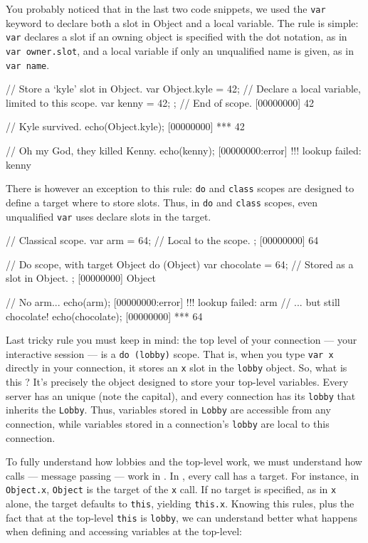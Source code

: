 You probably noticed that in the last two code snippets, we used the
\lstinline|var| keyword to declare both a slot in Object and a local
variable. The rule is simple: \lstinline|var| declares a slot if an
owning object is specified with the dot notation, as in %
\lstinline|var owner.slot|, and a local variable if only an
unqualified name is given, as in \lstinline|var name|.

\begin{urbiscript}
{
  // Store a `kyle' slot in Object.
  var Object.kyle = 42;
  // Declare a local variable, limited to this scope.
  var kenny = 42;
}; // End of scope.
[00000000] 42

// Kyle survived.
echo(Object.kyle);
[00000000] *** 42

// Oh my God, they killed Kenny.
echo(kenny);
[00000000:error] !!! lookup failed: kenny
\end{urbiscript}

There is however an exception to this rule: \lstinline|do| and
\lstinline|class| scopes are designed to define a target where to
store slots. Thus, in \lstinline|do| and \lstinline|class| scopes,
even unqualified \lstinline|var| uses declare slots in the target.

\begin{urbiscript}
// Classical scope.
{
  var arm = 64; // Local to the scope.
};
[00000000] 64

// Do scope, with target Object
do (Object)
{
  var chocolate = 64; // Stored as a slot in Object.
};
[00000000] Object

// No arm...
echo(arm);
[00000000:error] !!! lookup failed: arm
// ... but still chocolate!
echo(chocolate);
[00000000] *** 64
\end{urbiscript}

Last tricky rule you must keep in mind: the top level of your
connection --- your interactive session --- is a %
\lstinline|do (lobby)| scope. That is, when you type \lstinline|var x|
directly in your connection, it stores an \lstinline|x| slot in the
\lstinline|lobby| object. So, what is this ? It's precisely
the object designed to store your top-level variables. Every \urbi
server has an unique  (note the capital), and every
connection has its \lstinline|lobby| that inherits the
\lstinline|Lobby|. Thus, variables stored in \lstinline|Lobby| are
accessible from any connection, while variables stored in a
connection's \lstinline|lobby| are local to this connection.

To fully understand how lobbies and the top-level work, we must
understand how calls --- message passing --- work in \us.  In \us,
every call has a target. For instance, in \lstinline|Object.x|,
\lstinline|Object| is the target of the \lstinline|x| call. If no
target is specified, as in \lstinline|x| alone, the target defaults to
\lstinline|this|, yielding \lstinline|this.x|. Knowing this rules,
plus the fact that at the top-level \lstinline|this| is
\lstinline|lobby|, we can understand better what happens when defining
and accessing variables at the top-level:

